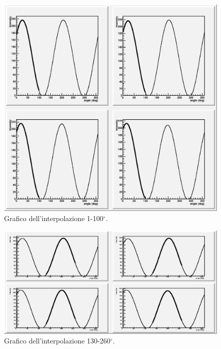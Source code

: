 \documentclass[italian,a4paper]{article}
\begin{document}
\begin{figure}[h]
    \begin{center}
        \includegraphics[height=0.4\textheight, width=.9\textwidth]{grafici/1-100g.eps}
    \end{center}
    \caption{Grafico dell'interpolazione 1-100$^\circ$.}
    \label{fig:1100g}
\end{figure}
\begin{figure}[h]
    \begin{center}
        \includegraphics[height=0.4\textheight, width=.9\textwidth]{grafici/130-260g.eps}
    \end{center}
    \caption{Grafico dell'interpolazione 130-260$^\circ$.}
    \label{fig:130260g}
\end{figure}
\end{document}

